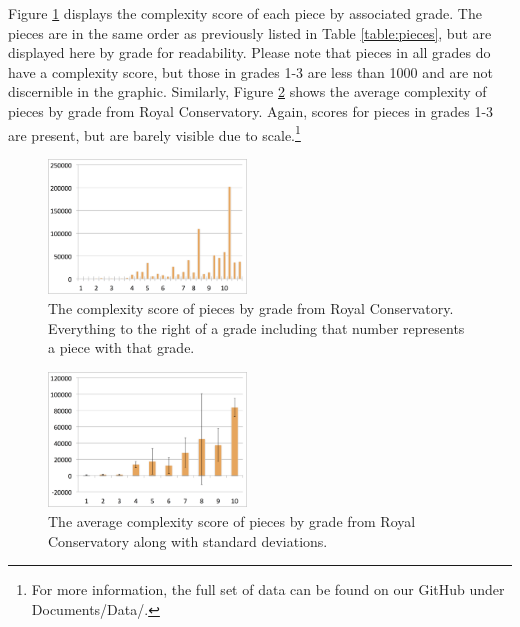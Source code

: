 \documentclass[10pt,preprint]{sigplanconf}
\begin{document}
Figure \ref{image:gradecomplexity} displays the complexity score of each piece by associated grade. The pieces are in the same order as previously listed in Table \ref{table:pieces}, but are displayed here by grade for readability. Please note that pieces in all grades do have a complexity score, but those in grades 1-3 are less than 1000 and are not discernible in the graphic. Similarly, Figure \ref{image:gradeaverage} shows the average complexity of pieces by grade from Royal Conservatory. Again, scores for pieces in grades 1-3 are present, but are barely visible due to scale.\footnote{For more information, the full set of data can be found on our GitHub \cite{GithubMusicScoring} under Documents/Data/.}

\begin{figure}
	\centering
		\includegraphics[width=0.47\textwidth]{GradesVsComplexityScores.png}
		\caption{The complexity score of pieces by grade from Royal Conservatory. Everything to the right of a grade including that number represents a piece with that grade.}
		\label{image:gradecomplexity}
\end{figure}

\begin{figure}
	\centering
		\includegraphics[width=0.47\textwidth]{GradesVsAverageComplexityScoresSTD.png}
		\caption{The average complexity score of pieces by grade from Royal Conservatory along with standard deviations.}
		\label{image:gradeaverage}
\end{figure}

\end{document}
